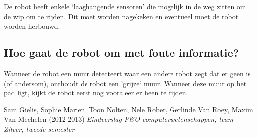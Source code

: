 \documentclass{peno}
\begin{document}
De robot heeft enkele `laaghangende sensoren' die mogelijk in de weg zitten om de wip om te rijden. Dit moet worden nagekeken en eventueel moet de robot worden herbouwd.



\subsection*{Hoe gaat de robot om met foute informatie?}
Wanneer de robot een muur detecteert waar een andere robot zegt dat er geen is (of andersom), onthoudt de robot een 'grijze` muur. Wanneer deze muur op het pad ligt, kijkt de robot eerst nog vooraleer er heen te rijden.


\begin{flushleft}
\begin{thebibliography}{9}

Sam Gielis, Sophie Marien, Toon Nolten, Nele Rober, Gerlinde Van Roey, Maxim Van Mechelen (2012-2013) \textit{Eindverslag P\&O computerwetenschappen, team Zilver, tweede semester}

\end{thebibliography}
\end{flushleft}
\end{document}
